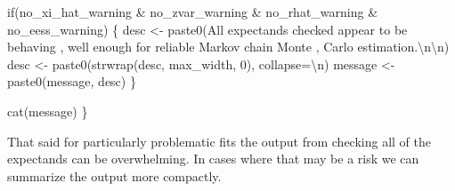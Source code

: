 \documentclass[
  letterpaper,
  DIV=11,
  numbers=noendperiod]{scrartcl}
\newenvironment{Shaded}{\begin{snugshade}}{\end{snugshade}}
\newcommand{\AttributeTok}[1]{\textcolor[rgb]{0.40,0.45,0.13}{#1}}
\newcommand{\ControlFlowTok}[1]{\textcolor[rgb]{0.00,0.23,0.31}{#1}}
\newcommand{\DecValTok}[1]{\textcolor[rgb]{0.68,0.00,0.00}{#1}}
\newcommand{\FunctionTok}[1]{\textcolor[rgb]{0.28,0.35,0.67}{#1}}
\newcommand{\NormalTok}[1]{\textcolor[rgb]{0.00,0.23,0.31}{#1}}
\newcommand{\OtherTok}[1]{\textcolor[rgb]{0.00,0.23,0.31}{#1}}
\newcommand{\SpecialCharTok}[1]{\textcolor[rgb]{0.37,0.37,0.37}{#1}}
\newcommand{\StringTok}[1]{\textcolor[rgb]{0.13,0.47,0.30}{#1}}
\begin{document}
\begin{Shaded}
\begin{Highlighting}[]
  \ControlFlowTok{if}\NormalTok{(no\_xi\_hat\_warning }\SpecialCharTok{\&}\NormalTok{ no\_zvar\_warning }\SpecialCharTok{\&} 
\NormalTok{     no\_rhat\_warning }\SpecialCharTok{\&}\NormalTok{ no\_eess\_warning) \{}
\NormalTok{    desc }\OtherTok{\textless{}{-}} \FunctionTok{paste0}\NormalTok{(}\StringTok{\textquotesingle{}All expectands checked appear to be behaving \textquotesingle{}}\NormalTok{,}
                   \StringTok{\textquotesingle{}well enough for reliable Markov chain Monte \textquotesingle{}}\NormalTok{,}
                   \StringTok{\textquotesingle{}Carlo estimation.}\SpecialCharTok{\textbackslash{}n\textbackslash{}n}\StringTok{\textquotesingle{}}\NormalTok{)}
\NormalTok{    desc }\OtherTok{\textless{}{-}} \FunctionTok{paste0}\NormalTok{(}\FunctionTok{strwrap}\NormalTok{(desc, max\_width, }\DecValTok{0}\NormalTok{), }\AttributeTok{collapse=}\StringTok{\textquotesingle{}}\SpecialCharTok{\textbackslash{}n}\StringTok{\textquotesingle{}}\NormalTok{)}
\NormalTok{    message }\OtherTok{\textless{}{-}} \FunctionTok{paste0}\NormalTok{(message, desc)}
\NormalTok{  \}}

  \FunctionTok{cat}\NormalTok{(message)}
\NormalTok{\}}
\end{Highlighting}
\end{Shaded}

That said for particularly problematic fits the output from checking all
of the expectands can be overwhelming. In cases where that may be a risk
we can summarize the output more compactly.
\end{document}
